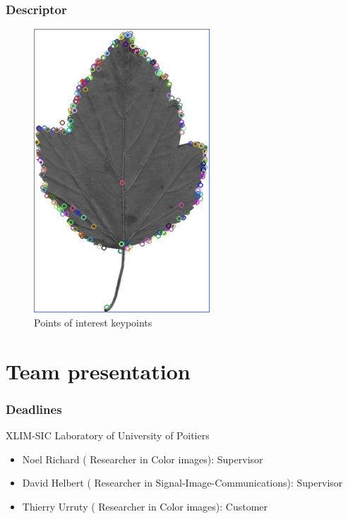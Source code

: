 \documentclass[xcolor=table]{beamer}
\begin{document}
\begin{frame} \frametitle{Descriptor}
    \begin{figure}[h]
        \centering
        \includegraphics[scale=0.35]{siftKP.jpg}
        \caption{Points of interest keypoints}
        \label{fig:img_poi}
    \end{figure}

\end{frame}


\section{Team presentation}

\begin{frame} \frametitle{Deadlines}
XLIM-SIC Laboratory of University of Poitiers
\begin{itemize}
\item Noel Richard ( Researcher in Color images): Supervisor
\item David Helbert ( Researcher in Signal-Image-Communications): Supervisor
\item Thierry Urruty ( Researcher in Color images): Customer
\end{itemize}

\end{frame}
\end{document}
